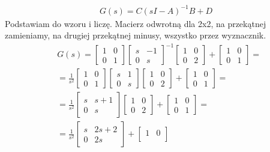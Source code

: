 \documentclass[a4paper,11pt]{article}
\begin{document}
\begin{align*}
G(s) = C(sI-A)^{-1}B + D 
\end{align*}
Podstawiam do wzoru i liczę. Macierz odwrotną dla 2x2, na przekątnej zamieniamy, na drugiej przekątnej minusy, wszystko przez wyznacznik.
\begin{align*}
& G(s)=
\begin{bmatrix}
1 & 0 \\
0 & 1
\end{bmatrix}
\begin{bmatrix}
s & -1 \\
0 & s
\end{bmatrix}^{-1}
\begin{bmatrix}
1 & 0 \\
0 & 2
\end{bmatrix}
+
\begin{bmatrix}
1 & 0 \\
0 & 1
\end{bmatrix}
= \\
&
=
\frac{1}{s^{2}}
\begin{bmatrix}
1 & 0 \\
0 & 1
\end{bmatrix}
\begin{bmatrix}
s & 1 \\
0 & s
\end{bmatrix}
\begin{bmatrix}
1 & 0 \\
0 & 2
\end{bmatrix}
+
\begin{bmatrix}
1 & 0 \\
0 & 1
\end{bmatrix}=\\
&
=
\frac{1}{s^{2}}
\begin{bmatrix}
s & s+1 \\
0 & s
\end{bmatrix}
\begin{bmatrix}
1 & 0 \\
0 & 2
\end{bmatrix}
+
\begin{bmatrix}
1 & 0 \\
0 & 1
\end{bmatrix}
= \\
& =
\frac{1}{s^{2}}
\begin{bmatrix}
s & 2s+2 \\
0 & 2s
\end{bmatrix}
+
\begin{bmatrix}
1 & 0 \\

\end{bmatrix}
\end{align*}
\end{document}
